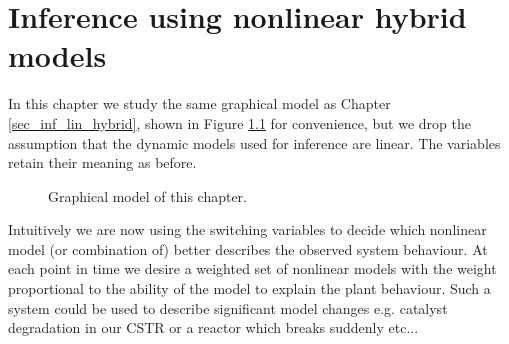 \chapter{Inference using nonlinear hybrid models}
\label{sec_inf_spf}
In this chapter we study the same graphical model as Chapter \ref{sec_inf_lin_hybrid}, shown in Figure \ref{fig_hybridmod2} for convenience, but we drop the assumption that the dynamic models used for inference are linear. The variables retain their meaning as before.     
\begin{figure}[H] 
\centering
{}
\caption{Graphical model of this chapter.}
\label{fig_hybridmod2}
\end{figure}
Intuitively we are now using the switching variables to decide which nonlinear model (or combination of) better describes the observed system behaviour. At each point in time we desire a weighted set of nonlinear models with the weight proportional to the ability of the model to explain the plant behaviour. Such a system could be used to describe significant model changes e.g. catalyst degradation in our CSTR or a reactor which breaks suddenly etc... 

